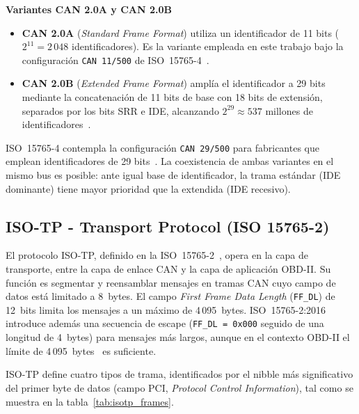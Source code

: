 \medskip\noindent\textbf{Variantes CAN 2.0A y CAN 2.0B}
\begin{itemize}
    \item \textbf{CAN 2.0A} (\textit{Standard Frame Format}) utiliza un identificador de 11 bits ($2^{11} = 2\,048$ identificadores). Es la variante empleada en este trabajo bajo la configuración \texttt{CAN~11/500} de ISO~15765-4~\cite{ISO15765-4:2021}.
    \item \textbf{CAN 2.0B} (\textit{Extended Frame Format}) amplía el identificador a 29 bits mediante la concatenación de 11 bits de base con 18 bits de extensión, separados por los bits SRR e IDE, alcanzando $2^{29} \approx 537$ millones de identificadores~\cite{ISO11898-1:2024}.
\end{itemize}
ISO~15765-4 contempla la configuración \texttt{CAN~29/500} para fabricantes que emplean identificadores de 29 bits~\cite{ISO15765-4:2021}. La coexistencia de ambas variantes en el mismo bus es posible: ante igual base de identificador, la trama estándar (IDE dominante) tiene mayor prioridad que la extendida (IDE recesivo).

\subsection{ISO-TP - Transport Protocol (ISO 15765-2)}
\label{sec:proto_isotp}

El protocolo ISO-TP, definido en la ISO~15765-2~\cite{ISO15765-2:2016}, opera en la capa de transporte, entre la capa de enlace CAN y la capa de aplicación OBD-II. Su función es segmentar y reensamblar mensajes en tramas CAN cuyo campo de datos está limitado a 8~bytes. El campo \textit{First Frame Data Length} (\texttt{FF\_DL}) de 12~bits limita los mensajes a un máximo de 4\,095~bytes. ISO~15765-2:2016 introduce además una secuencia de escape (\texttt{FF\_DL = 0x000} seguido de una longitud de 4~bytes) para mensajes más largos, aunque en el contexto OBD-II el límite de 4\,095~bytes~\cite{ISO15765-2:2016} es suficiente.

ISO-TP define cuatro tipos de trama, identificados por el nibble más significativo del primer byte de datos (campo PCI, \textit{Protocol Control Information}), tal como se muestra en la tabla~\ref{tab:isotp_frames}.
\begin{table}[!htbp]
\caption{Estructura de los cuatro tipos de trama ISO-TP según ISO~15765-2~\cite{ISO15765-2:2016}. Los bytes de \textit{padding} (\texttt{0xAA}) en FC son ignorados por el receptor. Leyenda de campos bajo la tabla.}
\label{tab:isotp_frames}

\end{table}

